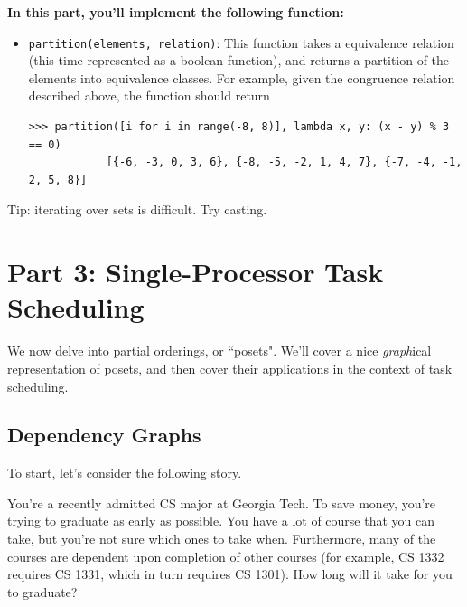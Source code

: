 \documentclass{article}
\begin{document}
    \vspace{3mm}
    \begin{tcolorbox}[colback=yellow!30]
        \textbf{In this part, you'll implement the following function:}
        \begin{itemize}
            \item \lstinline{partition(elements, relation)}: This function takes a equivalence relation (this time represented as a boolean function), and returns a partition of the elements into equivalence classes. For example, given the congruence relation described above, the function should return
        \begin{lstlisting}[belowskip=-10pt]
            >>> partition([i for i in range(-8, 8)], lambda x, y: (x - y) % 3 == 0)
            [{-6, -3, 0, 3, 6}, {-8, -5, -2, 1, 4, 7}, {-7, -4, -1, 2, 5, 8}]
        \end{lstlisting}

        \end{itemize}

        Tip: iterating over sets is difficult. Try casting.
    \end{tcolorbox}


\section*{Part 3: Single-Processor Task Scheduling}

    We now delve into partial orderings, or ``posets". We'll cover a nice \textit{graph}ical representation of posets, and then cover their applications in the context of task scheduling. 
    

    \subsection*{Dependency Graphs}
    
    To start, let's consider the following story. 

    \begin{tcolorbox}[colback=red!20]
        You're a recently admitted CS major at Georgia Tech. To save money, you're trying to graduate as early as possible.  You have a lot of course that you can take, but you're not sure which ones to take when. Furthermore, many of the courses are dependent upon completion of other courses (for example, CS 1332 requires CS 1331, which in turn requires CS 1301). How long will it take for you to graduate?
    \end{tcolorbox}
\end{document}
